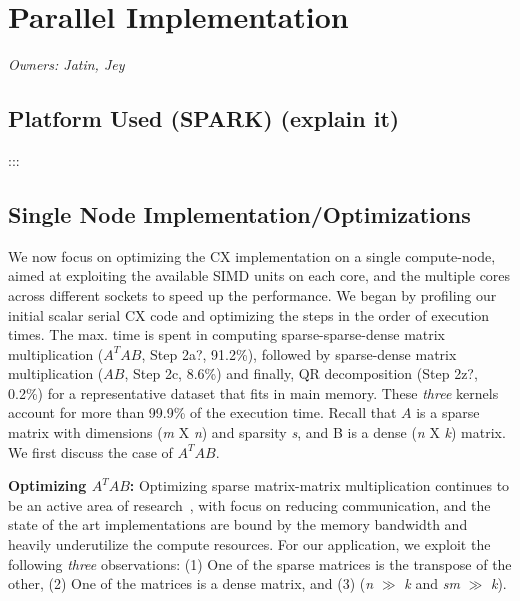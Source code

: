 \newcommand{\Comment}[2]{{\color{red}{#1} :::  \color{blue}{#2}}\\}

\newpage
\section{Parallel Implementation}
\textit{Owners: Jatin, Jey}

\subsection {Platform Used (SPARK) (explain it) }
    \Comment{Jatin}{Jey to explain the SPARK compute node, with some
    details on cache size, cores, SIMD width, etc.}



\subsection {Single Node Implementation/Optimizations}

    We now focus on optimizing the CX implementation on a single
    compute-node, aimed at exploiting the available SIMD units on each
    core, and the multiple cores across different sockets to speed up the performance. 
    We began by profiling our initial %
    scalar serial CX
    code and optimizing the steps in the order of execution times.
    The max. time is spent in computing sparse-sparse-dense matrix
    multiplication ($A^TAB$, Step 2a?, 91.2\%), followed by  sparse-dense matrix
    multiplication ($AB$, Step 2c, 8.6\%) and finally, QR
    decomposition (Step 2z?, 0.2\%)
    for a representative dataset that fits in main memory. These
    {\it{three}} kernels account for more than 99.9\% of
    the execution time.
    Recall that $A$ is a sparse matrix with dimensions ({\it{m}} X
    {\it{n}}) and sparsity {\it{s}}, and B is a dense ({\it{n}} X {\it{k}}) matrix.
    We first discuss the case of $A^TAB$.

\vspace*{0.1in} 
{\bf{{ {Optimizing $A^TAB$:}}}}
    Optimizing sparse matrix-matrix  multiplication continues to be an
    active area of research~\cite{patwary15,ballard}, with focus on
    reducing communication, and the state of the art implementations
    are bound by the memory bandwidth and heavily
    underutilize the compute resources. 
    For our application, we exploit the following {\it{three}} observations:
    (1) One of the sparse matrices is the transpose of the other,   
    (2) One of the matrices is a dense matrix,   and    %
    (3) ({\it{n}} $\gg$  {\it{k}} and  {\it{sm}} $\gg$ {\it{k}}).

